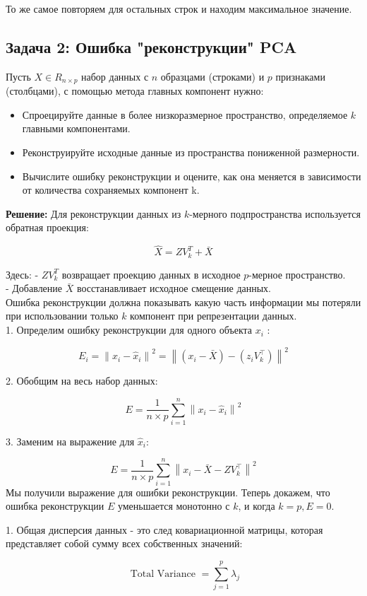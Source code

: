 То же самое повторяем для остальных строк и находим максимальное значение.
\subsection{Задача 2: Ошибка "реконструкции" PCA}
Пусть $X \in R_{n\times p}$ набор данных с $n$ образцами (строками) и $p$ признаками (столбцами), с помощью метода главных компонент нужно:
\begin{itemize}
    \item{Спроецируйте данные в более низкоразмерное пространство, определяемое $k$ главными компонентами.}
    \item {Реконструируйте исходные данные из пространства пониженной размерности.}
    \item {Вычислите ошибку реконструкции и оцените, как она меняется в зависимости от количества сохраняемых компонент k.}
\end{itemize}
\textbf{Решение:}
Для реконструкции данных из $k$-мерного подпространства используется обратная проекция:

$$
    \hat{X}=Z V_k^T+\bar{X}
$$


Здесь:
- $Z V_k^T$ возвращает проекцию данных в исходное $p$-мерное пространство.\\
- Добавление $\bar{X}$ восстанавливает исходное смещение данных. \\
Ошибка реконструкции должна показывать какую часть информации мы потеряли при использовании только $k$ компонент при репрезентации данных.\\
1. Определим ошибку реконструкции для одного объекта $x_i$ :

$$
    E_i=\left\|x_i-\hat{x}_i\right\|^2=\left\|\left(x_i-\bar{X}\right)-\left(z_i V_k^{\top}\right)\right\|^2
$$

2. Обобщим на весь набор данных:

$$
    E=\frac{1}{n \times p} \sum_{i=1}^n\left\|x_i-\hat{x}_i\right\|^2
$$

3. Заменим на выражение для $\hat{x}_i$:

$$
    E=\frac{1}{n \times p} \sum_{i=1}^n\left\|x_i-\bar{X}-Z V_k^{\top}\right\|^2
$$
Мы получили выражение для ошибки реконструкции. Теперь докажем, что
ошибка реконструкции $E$ уменьшается монотонно с $k$, и когда $k=p, E=0$.

1. Общая дисперсия данных - это след ковариационной матрицы, которая представляет собой сумму всех собственных значений:

$$
    \text { Total Variance }=\sum_{j=1}^p \lambda_j
$$

